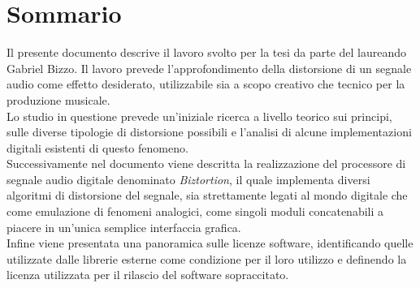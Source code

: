
\cleardoublepage
{}
{}
\begingroup
\let\clearpage\relax
\let\cleardoublepage\relax
\let\cleardoublepage\relax

\chapter*{Sommario}

Il presente documento descrive il lavoro svolto per la tesi da parte del laureando Gabriel Bizzo. Il lavoro prevede l'approfondimento della distorsione di un segnale audio come effetto desiderato, utilizzabile sia a scopo creativo che tecnico per la produzione musicale. \\
Lo studio in questione prevede un'iniziale ricerca a livello teorico sui principi, sulle diverse tipologie di distorsione possibili e l'analisi di alcune implementazioni digitali esistenti di questo fenomeno. \\
Successivamente nel documento viene descritta la realizzazione del processore di segnale audio digitale denominato \textit{Biztortion}, il quale implementa diversi algoritmi di distorsione del segnale, sia strettamente legati al mondo digitale che come emulazione di fenomeni analogici, come singoli moduli concatenabili a piacere in un'unica semplice interfaccia grafica. \\
Infine viene presentata una panoramica sulle licenze software, identificando quelle utilizzate dalle librerie esterne come condizione per il loro utilizzo e definendo la licenza utilizzata per il rilascio del software sopraccitato.

\endgroup			

\vfill

